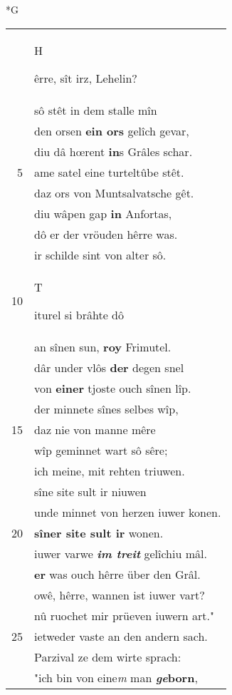 \documentclass[8pt,a4paper,notitlepage]{article}
\begin{document}
\begin{table}[ht]
\begin{minipage}[t]{0.5\linewidth}
\small
\begin{center}*G
\end{center}
\begin{tabular}{rl}
 & \begin{large}H\end{large}êrre, sît irz, Lehelin?\\ 
 & sô stêt in dem stalle mîn\\ 
 & den orsen \textbf{ein ors} gelîch gevar,\\ 
 & diu dâ hœrent \textbf{in}s Grâles schar.\\ 
5 & ame satel eine turteltûbe stêt.\\ 
 & daz ors von Muntsalvatsche gêt.\\ 
 & diu wâpen gap \textbf{in} Anfortas,\\ 
 & dô er der vröuden hêrre was.\\ 
 & ir schilde sint von alter sô.\\ 
10 & \begin{large}T\end{large}iturel si brâhte dô\\ 
 & an sînen sun, \textbf{roy} Frimutel.\\ 
 & dâr under vlôs \textbf{der} degen snel\\ 
 & von \textbf{einer} tjoste ouch sînen lîp.\\ 
 & der minnete sînes selbes wîp,\\ 
15 & daz nie von manne mêre\\ 
 & wîp geminnet wart sô sêre;\\ 
 & ich meine, mit rehten triuwen.\\ 
 & sîne site sult ir niuwen\\ 
 & unde minnet von herzen iuwer konen.\\ 
20 & \textbf{sîner site sult ir} wonen.\\ 
 & iuwer varwe \textit{\textbf{im treit}} gelîchiu mâl.\\ 
 & \textbf{er} was ouch hêrre über den Grâl.\\ 
 & owê, hêrre, wannen ist iuwer vart?\\ 
 & nû ruochet mir prüeven iuwern art."\\ 
25 & ietweder vaste an den andern sach.\\ 
 & Parzival ze dem wirte sprach:\\ 
 & "ich bin von eine\textit{m} man \textbf{\textit{ge}born},\\ 

\end{tabular}
\end{minipage}
\end{table}
\end{document}
